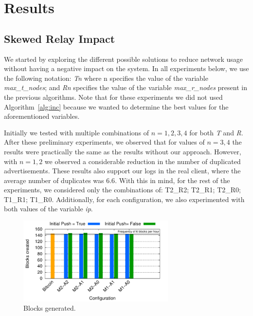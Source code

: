 \section{Results}
\label{sec:results}

\subsection{Skewed Relay Impact}
\label{sec:sri}

We started by exploring the different possible solutions to reduce network usage without having a negative impact on the system. In all experiments below, we use the following notation: \textsl{Tn} where n specifies the value of the variable \textsl{max\_t\_nodes}; and \textsl{Rn} specifies the value of the variable \textsl{max\_r\_nodes} present in the previous algorithms. Note that for these experiments we did not used Algorithm~\ref{alg:inc} because we wanted to determine the best values for the aforementioned variables.

Initially we tested with multiple combinations of $n={1,2,3,4}$ for both \textsl{T} and \textsl{R}. After these preliminary experiments, we observed that for values of $n={3,4}$ the results were practically the same as the results without our approach. However, with $n={1,2}$ we observed a considerable reduction in the number of duplicated advertisements.
These results also support our logs in the real client, where the average number of duplicates was $6.6$. With this in mind, for the rest of the experiments, we considered only the combinations of: T2\_R2; T2\_R1; T2\_R0; T1\_R1; T1\_R0. Additionally, for each configuration, we also experimented with both values of the variable \textsl{ip}.

\begin{figure}
\centering
\includegraphics[width=0.7\textwidth]{plots/blocks-gen.pdf}
\caption{Blocks generated.}
\label{fig:nb-blocks}
\end{figure}

